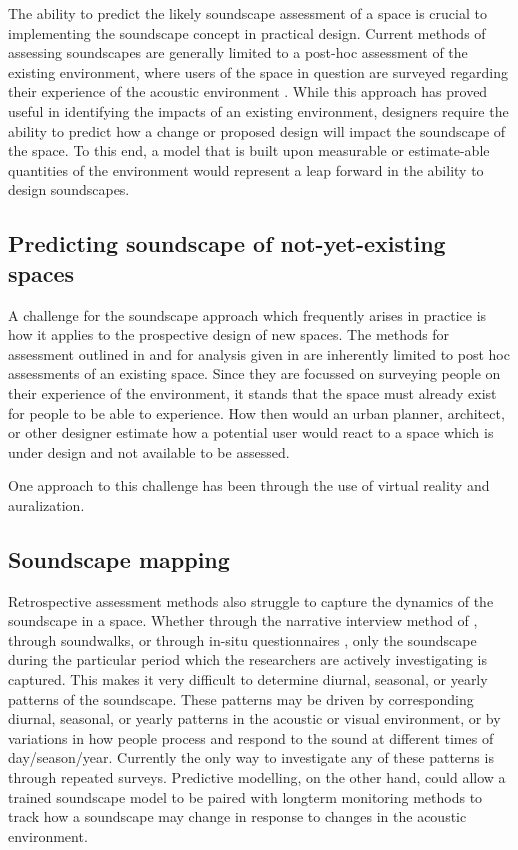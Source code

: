 The ability to predict the likely soundscape assessment of a space is crucial to implementing the soundscape concept in practical design. Current methods of assessing soundscapes are generally limited to a post-hoc assessment of the existing environment, where users of the space in question are surveyed regarding their experience of the acoustic environment \citep{Engel2018Review, Zhang2018Effect}. While this approach has proved useful in identifying the impacts of an existing environment, designers require the ability to predict how a change or proposed design will impact the soundscape of the space. To this end, a model that is built upon measurable or estimate-able quantities of the environment would represent a leap forward in the ability to design soundscapes.

\subsection{Predicting soundscape of not-yet-existing spaces}

A challenge for the soundscape approach which frequently arises in practice is how it applies to the prospective design of new spaces. The methods for assessment outlined in \citet{ISO12913Part2} and for analysis given in \citet{ISO12913Part3} are inherently limited to post hoc assessments of an existing space. Since they are focussed on surveying people on their experience of the environment, it stands that the space must already exist for people to be able to experience. How then would an urban planner, architect, or other designer estimate how a potential user would react to a space which is under design and not available to be assessed.

One approach to this challenge has been through the use of virtual reality and auralization.

\subsection{Soundscape mapping}

Retrospective assessment methods also struggle to capture the dynamics of the soundscape in a space. Whether through the narrative interview method of , through soundwalks, or through in-situ questionnaires \citep{Mitchell2020Soundscape}, only the soundscape during the particular period which the researchers are actively investigating is captured. This makes it very difficult to determine diurnal, seasonal, or yearly patterns of the soundscape. These patterns may be driven by corresponding diurnal, seasonal, or yearly patterns in the acoustic or visual environment, or by variations in how people process and respond to the sound at different times of day/season/year. Currently the only way to investigate any of these patterns is through repeated surveys. Predictive modelling, on the other hand, could allow a trained soundscape model to be paired with longterm monitoring methods to track how a soundscape may change in response to changes in the acoustic environment. 

